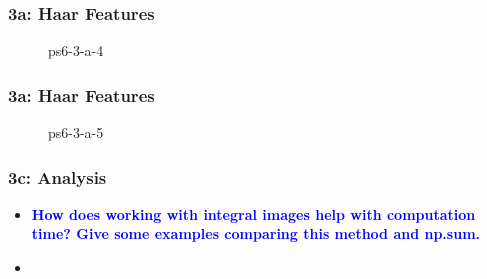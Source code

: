 \documentclass[../report.tex]{subfiles}
\begin{document}
    \begin{frame}
        \frametitle{3a: Haar Features}
        \begin{figure}[!htb]
            \centering
            \caption{ps6-3-a-4}
        \end{figure}
    \end{frame}

    \begin{frame}
        \frametitle{3a: Haar Features}
        \begin{figure}[!htb]
            \centering
            \caption{ps6-3-a-5}
        \end{figure}
    \end{frame}

    \begin{frame}[t]
        \frametitle{3c: Analysis}
        \begin{normalsize}
            \begin{itemize}
                \setlength\itemsep{1em}\fontsize{6pt}{6pt}

                \item[]{\textbf{\selectfont\textcolor{blue}{ How does working with integral images help with computation time? Give some examples comparing this method and np.sum. }}}
                
                \item[]\textbf{}
            \end{itemize}
        \end{normalsize}
    \end{frame}
    
\end{document}
